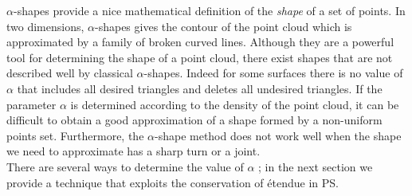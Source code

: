 $\alpha$-shapes provide a nice mathematical definition of the \textit{shape} of
a set of points. In two dimensions, $\alpha$-shapes gives the contour of the point cloud which is approximated by a family of broken curved lines. 
Although they are a powerful tool for determining the shape of a point cloud, there exist shapes that are not described well by classical $ \alpha $-shapes. Indeed for some surfaces there is no value of $\alpha$ that includes all desired triangles and deletes all undesired triangles. If the parameter $\alpha$ is determined according to the density of the point cloud, it can be difficult to obtain a good approximation of a shape formed by a non-uniform points set. Furthermore, the $\alpha$-shape method does not work well when the shape we need to approximate has a sharp turn or a joint. 
\\ \indent There are several ways to determine the value of $\alpha$ \cite{mandal1997selection}; in the next section we provide a technique that exploits the conservation of \'{e}tendue in PS. 
